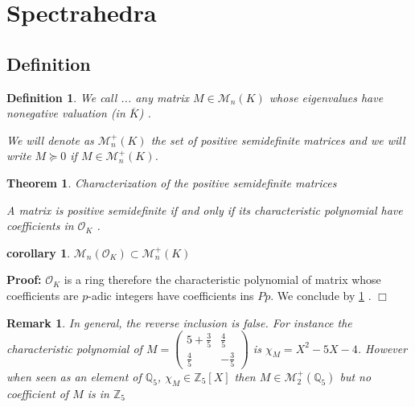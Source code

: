 \documentclass[a4paper,12pt]{article}
\newenvironment{proof}{\hbox{}\vspace{-0.5cm} {\bf Proof:}}{\hfill $\Box$ \\}
\newtheorem{theorem}{Theorem}
\newtheorem{corollary}{corollary}
\newtheorem{definition}{Definition}
\newtheorem{remark}{Remark}
\newcommand{\OK}{\mathcal{O}_K}
\begin{document}
\section{Spectrahedra}

\subsection{Definition}
\newcommand\Mat{Positive semidefinite matrix }
\newcommand\mats{positive semidefinite matrices }
\newcommand\Mats{positive semidefinite matrices }
\begin{definition}
	We call ... any matrix $M \in \mathcal{M}_n\left( K \right) $ whose eigenvalues have nonegative valuation (in $\overline{K}$) .
	
	We will denote as $ \mathcal{M}_n^+\left( K \right)$ the set of \mats and we will write $M \succeq 0$ if $M \in \mathcal{M}_n^+\left( K\right) $.
\end{definition}
\begin{theorem}
	\label{caracsdp}
	Characterization of the \mats
	
	A matrix is positive semidefinite if and only if its characteristic polynomial have coefficients in $\OK$ .
	
\end{theorem}


\begin{corollary}
	$\mathcal{M}_n(\OK) \subset \mathcal{M}_n^+\left( K \right)$ 
\end{corollary}

\begin{proof}
$\OK$ is a ring therefore the characteristic polynomial of matrix whose coefficients are $p$-adic integers have coefficients ins $Pp$. We conclude by \ref{caracsdp} .
\end{proof}



\begin{remark}
	In general, the reverse inclusion is false. For instance the characteristic polynomial of $M = \begin{pmatrix} 5 + \frac{3}{5} & \frac{4}{5} \\ \frac{4}{5} & -\frac{3}{5} \end{pmatrix} $ is $\chi_M = X^2  - 5 X - 4$. However when seen as an element of $\mathbb{Q}_5$, $\chi_M \in \mathbb{Z}_5[X]$ then $M \in \mathcal{M}_2^+\left( \mathbb{Q}_5 \right)$ but no coefficient of $M$ is in $\mathbb{Z}_5 $
\end{remark}
\end{document}
